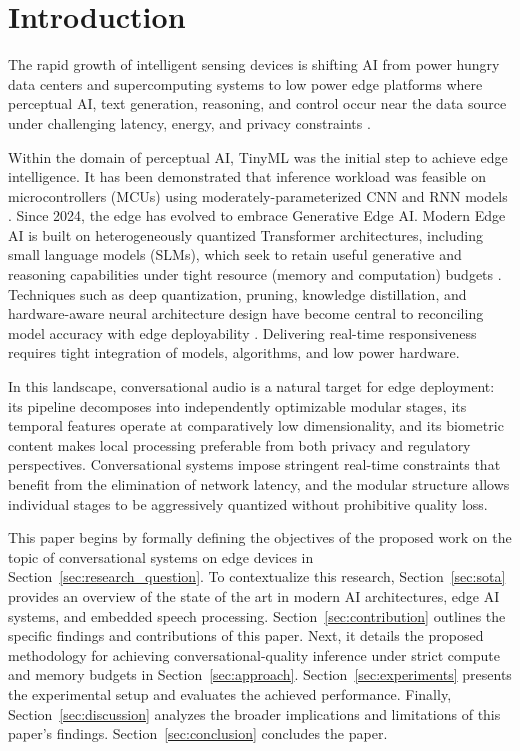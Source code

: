 \documentclass[manuscript,]{acmart} %
\begin{document}

\section{Introduction}\label{introd}
The rapid growth of intelligent sensing devices is shifting AI from power hungry data centers and supercomputing systems to low power edge platforms where perceptual AI, text generation, reasoning, and control occur near the data source under challenging latency, energy, and privacy constraints \cite{reddi2025generative}. 

Within the domain of perceptual AI, TinyML was the initial step to achieve edge intelligence. It has been demonstrated that inference workload was feasible on microcontrollers (MCUs) using moderately-parameterized CNN and RNN models \cite{10177729} \cite{mi13060851}. Since 2024, the edge has evolved to embrace Generative Edge AI. Modern Edge AI is built on heterogeneously quantized Transformer architectures, including small language models (SLMs), which seek to retain useful generative and reasoning capabilities under tight resource (memory and computation) budgets \cite{technologies12060081, electronics14173468}. Techniques such as deep quantization, pruning, knowledge distillation, and hardware-aware neural architecture design have become central to reconciling model accuracy with edge deployability \cite{s25103191}.
Delivering real-time responsiveness requires tight integration of models, algorithms, and low power hardware. 

In this landscape, conversational audio is a natural target for edge deployment: its pipeline decomposes into independently optimizable modular stages, its temporal features operate at comparatively low dimensionality, and its biometric content makes local processing preferable from both privacy and regulatory perspectives. Conversational systems impose stringent real-time constraints that benefit from the elimination of network latency, and the modular structure allows individual stages to be aggressively quantized without prohibitive quality loss.

This paper begins by formally defining the objectives of the proposed work on the topic of conversational systems on edge devices in Section~\ref{sec:research_question}. To contextualize this research, Section~\ref{sec:sota} provides an overview of the state of the art in modern AI architectures, edge AI systems, and embedded speech processing. Section~\ref{sec:contribution} outlines the specific findings and contributions of this paper. Next, it details the proposed methodology for achieving conversational-quality inference under strict compute and memory budgets in Section~\ref{sec:approach}. Section~\ref{sec:experiments} presents the experimental setup and evaluates the achieved performance. Finally, Section~\ref{sec:discussion} analyzes the broader implications and limitations of this paper's findings. Section~\ref{sec:conclusion} concludes the paper.
\end{document}
